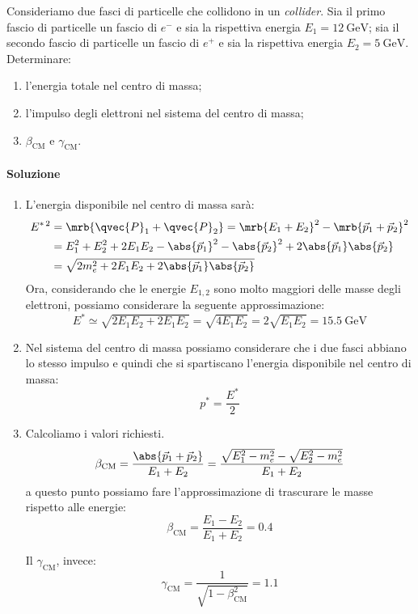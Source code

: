 \begin{example}[]
  Consideriamo due fasci di particelle che collidono in un \textit{collider}.
  Sia il primo fascio di particelle un fascio di $e^-$ e sia la rispettiva
  energia $E _{1} = \SI{12}{\GeV}$; sia il secondo fascio di particelle un
  fascio di $e^+$ e sia la rispettiva energia $E _{2} = \SI{5}{\GeV}$.
  Determinare:
  \begin{enumerate}
    \item l'energia totale nel centro di massa;
    \item l'impulso degli elettroni nel sistema del centro di massa;
    \item $\beta _\text{CM}$ e $\gamma _\text{CM}$.
  \end{enumerate}

  \paragraph{Soluzione}
  \begin{enumerate}
    \item L'energia disponibile nel centro di massa sarà:
      \begin{align*}
        E ^{\ast\,2} &= \mrb{\qvec{P}_{1} + \qvec{P}_{2}} = \mrb{E_1 + E_2} ^{2}
        - \mrb{\vec{p}_{1} + \vec{p}_{2}}^{2}
        \\
        &= E_1^2 + E_2^2 + 2 E_1 E_2 -
        \abs{\vec{p}_{1}}^{2} - \abs{\vec{p}_{2}}^{2} + 2 \abs{\vec{p}_{1}}
        \abs{\vec{p}_{2}}
        \\
        &= \sqrt{2 m_e^2 + 2 E_1 E_2 + 2 \abs{\vec{p}_{1}} \abs{\vec{p}_{2}}}
      \end{align*}
      Ora, considerando che le energie $E_{1,2}$ sono molto maggiori delle
      masse degli elettroni, possiamo considerare la seguente approssimazione:
      \[
        E ^{\ast} \simeq \sqrt{2 E_1 E_2 + 2 E_1 E_2} = \sqrt{4 E_1 E_2} = 2
        \sqrt{E_1 E_2} = \SI{15.5}{\GeV}
      \]

    \item Nel sistema del centro di massa possiamo considerare che i due fasci
      abbiano lo stesso impulso e quindi che si spartiscano l'energia
      disponibile nel centro di massa:
      \[
        p ^{\ast} = \frac{E ^{\ast}}{2}
      \]

    \item Calcoliamo i valori richiesti.
      \[
        \beta _\text{CM} = \frac{\abs{\vec{p}_{1} + \vec{p}_{2}}}{E_1 + E_2} =
        \frac{\sqrt{E_1^2 - m_e^2} - \sqrt{E_2^2 - m_e^2}}{E_1 + E_2}
      \]
      a questo punto possiamo fare l'approssimazione di trascurare le masse
      rispetto alle energie:
      \[
        \beta _\text{CM} = \frac{E_1 - E_2}{E_1 + E_2} = 0.4
      \]

      Il $\gamma _\text{CM}$, invece:
      \[
        \gamma _\text{CM} = \frac{1}{\sqrt{1 - \beta _\text{CM}^{2}}} = 1.1
      \]
  \end{enumerate}
\end{example}

